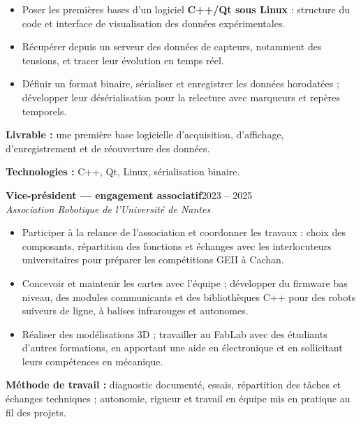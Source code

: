 \documentclass[10pt,a4paper]{article}
\newcommand{\poste}[3]{%
    \textbf{#1}\hfill #2\\
    \textit{#3}\par
}
\begin{document}
\begin{itemize}

    \item Poser les premières bases d'un logiciel
    \textbf{C++/Qt sous Linux} : structure du code et interface
    de visualisation des données expérimentales.

    \item Récupérer depuis un serveur des données de capteurs,
    notamment des tensions, et tracer leur évolution en
    temps réel.

    \item Définir un format binaire, sérialiser et enregistrer
    les données horodatées ; développer leur désérialisation
    pour la relecture avec marqueurs et repères temporels.

\end{itemize}

\textbf{Livrable :}
une première base logicielle d'acquisition, d'affichage,
d'enregistrement et de réouverture des données.

\textbf{Technologies :}
C++, Qt, Linux, sérialisation binaire.

\vspace{0.5cm}
\poste
{Vice-président --- engagement associatif}
{2023 -- 2025}
{Association Robotique de l'Université de Nantes}

\begin{itemize}

    \item Participer à la relance de l'association et
    coordonner les travaux : choix des composants,
    répartition des fonctions et échanges avec les
    interlocuteurs universitaires pour préparer les
    compétitions GEII à Cachan.

    \item Concevoir et maintenir les cartes avec l'équipe ;
    développer du firmware bas niveau, des modules
    communicants et des bibliothèques C++ pour des robots
    suiveurs de ligne, à balises infrarouges et autonomes.

    \item Réaliser des modélisations 3D ; travailler au FabLab
    avec des étudiants d'autres formations, en apportant une
    aide en électronique et en sollicitant leurs compétences
    en mécanique.

\end{itemize}

\textbf{Méthode de travail :}
diagnostic documenté, essais, répartition des tâches et échanges
techniques ; autonomie, rigueur et travail en équipe mis en
pratique au fil des projets.
\end{document}
